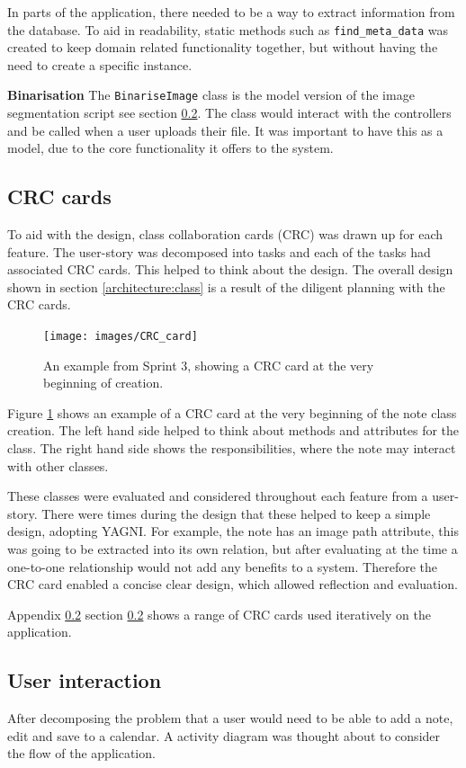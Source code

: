 In parts of the application, there needed to be a way to extract information from the database. To aid in readability, static methods such as \texttt{find\_meta\_data} was created to keep domain related functionality together, but without having the need to create a specific instance.

\textbf{Binarisation}
The \texttt{BinariseImage} class is the model version of the image segmentation script see section \ref{}. The class would interact with the controllers and be called when a user uploads their file. It was important to have this as a model, due to the core functionality it offers to the system.

\subsection{CRC cards}
To aid with the design, class collaboration cards (CRC) was drawn up for each feature. The user-story was decomposed into tasks and each of the tasks had associated CRC cards. This helped to think about the design.  The overall design shown in section \ref{architecture:class} is a result of the diligent planning with the CRC cards.

\begin{figure}[H]
  \centering
  \texttt{[image: images/CRC\_card]}
  \caption{An example from Sprint 3, showing a CRC card at the very beginning of creation.}
  \label{fig:crc1}
\end{figure}

Figure \ref{fig:crc1} shows an example of a CRC card at the very beginning of the note class creation. The left hand side helped to think about methods and attributes for the class. The right hand side shows the responsibilities, where the note may interact with other classes.

These classes were evaluated and considered throughout each feature from a user-story. There were times during the design that these helped to keep a simple design, adopting YAGNI. For example, the note has an image path attribute, this was going to be extracted into its own relation, but after evaluating at the time a one-to-one relationship would not add any benefits to a system. Therefore the CRC card enabled a concise clear design, which allowed reflection and evaluation.

Appendix \ref{} section \ref{} shows a range of CRC cards used iteratively on the application.


\subsection{User interaction}
After decomposing the problem that a user would need to be able to add a note, edit and save to a calendar. A activity diagram was thought about to consider the flow of the application.

